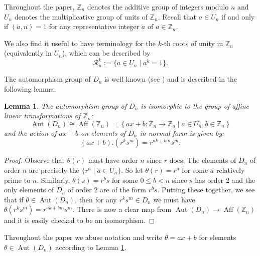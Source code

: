 \documentclass[12pt]{amsart}
\numberwithin{equation}{section}
\newtheorem{lemma}[theorem]{Lemma}
\theoremstyle{definition}
\newtheorem{remark}[theorem]{Remark}
\newcommand{\Aut}{\operatorname{Aut}}
\newcommand{\Aff}{\operatorname{Aff}}
\newcommand{\Z}{\mathbb{Z}}
\renewcommand{\Z}{\mathbb{Z}}
\begin{document}
Throughout the paper, $\Z_n$ denotes the additive group of integers
modulo $n$ and $U_n$ denotes the multiplicative group of units of
$\Z_n$.  Recall that $a \in U_n$ if and only if $(\dot{a},n) = 1$ for
any representative integer $\dot{a}$ of $a \in \Z_n$.

We also find it useful to have terminology for the $k$-th roots of unity in $\Z_n$ (equivalently in $U_n$), which can be described by
$$\mathcal{R}_n^k:=\{a\in U_n\mid a^k=1\}.$$

The automorphism group of $D_n$ is well known (see \cite[Theorem A]{Walls}) 
and is described in the following lemma.
\begin{lemma}
\label{lem:aut} The automorphism group of $D_n$ is isomorphic to the 
group of affine linear transformations of $\Z_n$:
$$\Aut(D_n)\cong \Aff(\Z_n)=\left\{ ax+b: \Z_n\to\Z_n \mid a \in U_n, b \in
\Z_n \right\}$$
and the action of $ax+b$ on elements of $D_n$ in normal form is given by:
\[ (ax+b).(r^k s^m) = r^{ak+bm}s^m.\]
\end{lemma}
\begin{proof}
Observe that $\theta(r)$ must have order $n$ since $r$ does. The
elements of $D_n$ of order $n$ are precisely the $\{ r^a \mid a \in
U_n \}$.
So let $\theta(r) = r^a$ for some $a$ relatively prime to
$n$. Similarly, $\theta(s)=r^bs$ for some $0 \le b < n$ since $s$ has
order 2 and the only elements of $D_n$ of order 2 are of the form $r^bs$.
Putting these together, we see that if
$\theta\in\Aut(D_n)$, then for any $r^ks^m\in D_n$ we must have
$\theta(r^ks^m)=r^{ak+bm}s^m$. There is now a clear map from
$\Aut(D_n)\to \Aff(\Z_n)$ and it is easily checked to be an isomorphism.
\end{proof}

Throughout the paper we abuse notation and write $\theta = ax+b$ for
elements $\theta \in \Aut(D_n)$ according to Lemma \ref{lem:aut}.

\end{document}
